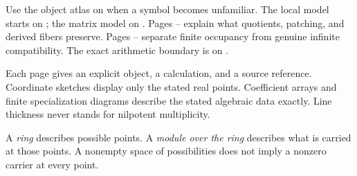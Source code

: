 Use the object atlas on  when a symbol becomes unfamiliar. The local model starts on ; the matrix model on . Pages -- explain what quotients, patching, and derived fibers preserve. Pages -- separate finite occupancy from genuine infinite compatibility. The exact arithmetic boundary is on .

Each page gives an explicit object, a calculation, and a source reference. Coordinate sketches display only the stated real points. Coefficient arrays and finite specialization diagrams describe the stated algebraic data exactly. Line thickness never stands for nilpotent multiplicity.


A \emph{ring} describes possible points. A \emph{module over the ring} describes what is carried at those points. A nonempty space of possibilities does not imply a nonzero carrier at every point.

